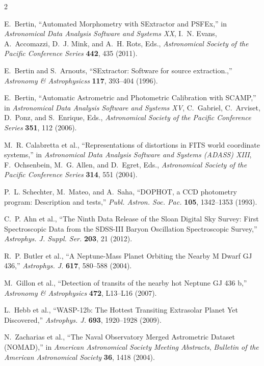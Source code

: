 \documentclass[a4paper,12pt]{spieman}  %
\begin{document}
\begin{spacing}{2}
\begin{thebibliography}{}
E.~{Bertin}, ``{Automated Morphometry with SExtractor and PSFEx},'' in {\em
  Astronomical Data Analysis Software and Systems XX},  I.~N. {Evans},
  A.~{Accomazzi}, D.~J. {Mink}, and A.~H. {Rots}, Eds., {\em Astronomical
  Society of the Pacific Conference Series} {\bf 442}, 435  (2011).

E.~{Bertin} and S.~{Arnouts}, ``{SExtractor: Software for source
  extraction.},'' {\em Astronomy \& Astrophysicss} {\bf 117}, 393--404  (1996).

E.~{Bertin}, ``{Automatic Astrometric and Photometric Calibration with
  SCAMP},'' in {\em Astronomical Data Analysis Software and Systems XV},
  C.~{Gabriel}, C.~{Arviset}, D.~{Ponz}, and S.~{Enrique}, Eds., {\em
  Astronomical Society of the Pacific Conference Series} {\bf 351}, 112
  (2006).

M.~R. {Calabretta} et al., 
  ``{Representations of distortions in FITS world coordinate systems},'' in
  {\em Astronomical Data Analysis Software and Systems (ADASS) XIII},
  F.~{Ochsenbein}, M.~G. {Allen}, and D.~{Egret}, Eds., {\em Astronomical
  Society of the Pacific Conference Series} {\bf 314}, 551  (2004).

P.~L. {Schechter}, M.~{Mateo}, and A.~{Saha}, ``{DOPHOT, a CCD photometry
  program: Description and tests},'' {\em Publ. Astron. Soc. Pac.} {\bf 105}, 1342--1353  (1993).

C.~P. {Ahn} et al., ``{The Ninth Data Release of the Sloan Digital Sky
  Survey: First Spectroscopic Data from the SDSS-III Baryon Oscillation
  Spectroscopic Survey},'' {\em Astrophys. J. Suppl. Ser.} {\bf 203}, 21  (2012).

R.~P. {Butler} et al., ``{A Neptune-Mass Planet
  Orbiting the Nearby M Dwarf GJ 436},'' {\em Astrophys. J.} {\bf 617}, 580--588
  (2004).

M.~{Gillon} et al., ``{Detection of
  transits of the nearby hot Neptune GJ 436 b},'' {\em Astronomy \& Astrophysics} {\bf 472},
  L13--L16  (2007).

L.~{Hebb} et al., ``{WASP-12b: The Hottest Transiting Extrasolar Planet Yet
  Discovered},'' {\em Astrophys. J.} {\bf 693}, 1920--1928  (2009).

N.~{Zacharias} et al., ``{The Naval Observatory Merged Astrometric Dataset
  (NOMAD)},'' in {\em American Astronomical Society Meeting Abstracts},  {\em
  Bulletin of the American Astronomical Society} {\bf 36}, 1418  (2004).


\end{thebibliography}
\end{spacing}
\end{document}
